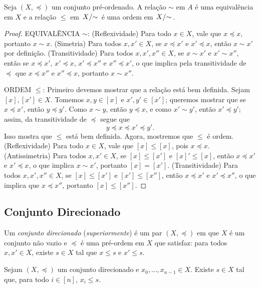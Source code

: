 \begin{prop}
Seja $(X,\preceq)$ um conjunto pré-ordenado. A relação $\sim$ em $A$ é uma equivalência em $X$ e a relação $\leq$ em $\quo{X}{\sim}$ é uma ordem em $\quo{X}{\sim}$.
\end{prop}
\begin{proof}
EQUIVALÊNCIA $\sim$: (Reflexividade) Para todo $x \in X$, vale que $x \preceq x$, portanto $x \sim x$. (Simetria) Para todos $x,x' \in X$, se $x \preceq x'$ e $x' \preceq x$, então $x \sim x'$ por definição. (Transitividade) Para todos $x,x',x'' \in X$, se $x \sim x'$ e $x' \sim x''$, então se $x \preceq x'$, $x' \preceq x$, $x' \preceq x''$ e $x'' \preceq x'$, o que implica pela transitividade de $\preceq$ que $x \preceq x''$ e $x'' \preceq x$, portanto $x \sim x''$.

ORDEM $\leq$: Primeiro devemos mostrar que a relação está bem definida. Sejam $[x],[x'] \in X$. Tomemos $x,y \in [x]$ e $x',y' \in [x']$; queremos mostrar que se $x \preceq x'$, então $y \preceq y'$. Como $x \sim y$, então $y \preceq x$, e como $x' \sim y'$, então $x' \preceq y'$; assim, da transitividade de $\preceq$ segue que
	\begin{equation*}
	y \preceq x \preceq x' \preceq y'.
	\end{equation*}
Isso mostra que $\leq$ está bem definida. Agora, mostremos que $\leq$ é ordem. (Reflexividade) Para todo $x \in X$, vale que $[x] \leq [x]$, pois $x \preceq x$. (Antissimetria) Para todos $x,x' \in X$, se $[x] \leq [x']$ e $[x]' \leq [x]$, então $x \preceq x'$ e $x' \preceq x$, o que implica $x \sim x'$, portanto $[x]=[x']$. (Transitividade) Para todos $x,x',x'' \in X$, se $[x] \leq [x']$ e $[x'] \leq [x'']$, então $x \preceq x'$ e $x' \preceq x''$, o que implica que $x \preceq x''$, portanto $[x] \leq [x'']$.
\end{proof}

\subsection{Conjunto Direcionado}

\begin{defi}
Um \emph{conjunto direcionado} (\emph{superiormente}) é um par $(X,\preceq)$ em que $X$ é um conjunto não vazio e $\preceq$ é uma pré-ordem em $X$ que satisfaz: para todos $x,x' \in X$, existe $s \in X$ tal que $x \leq s$ e $x' \leq s$.
\end{defi}

\begin{prop}
Sejam $(X,\preceq)$ um conjunto direcionado e $x_0,\ldots,x_{n-1} \in X$. Existe $s \in X$ tal que, para todo $i \in [n]$, $x_i \leq s$.
\end{prop}

